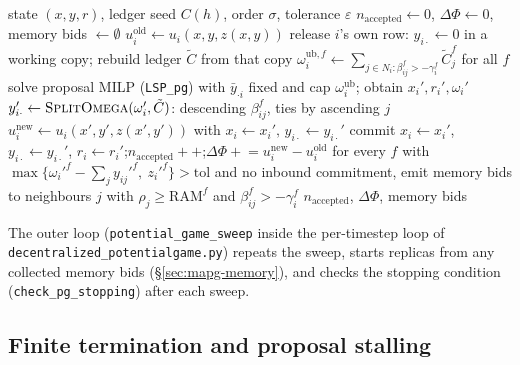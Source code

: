 \begin{algorithm}[H]
\caption{\textsc{FaaS-MAPG} --- one better-response sweep}
\label{alg:mapg-sweep}
\begin{algorithmic}[1]
\Require state $(x,y,r)$, ledger seed $C(h)$, order $\sigma$, tolerance $\varepsilon$
\State $n_{\mathrm{accepted}}\gets 0$, $\Delta\Phi\gets 0$, memory bids $\gets\emptyset$
  \State $u_i^{\mathrm{old}}\gets u_i(x,y,z(x,y))$
  \State release $i$'s own row: $y_{i\cdot}\gets0$ in a working copy; rebuild ledger $\tilde C$ from that copy
  \State $\omega_i^{\mathrm{ub},f}\gets\sum_{j\in N_i:\beta_{ij}^f>-\gamma_i^f}\tilde C_j^f$ for all $f$
  \State solve proposal MILP (\texttt{LSP\_pg}) with $\bar y_{\cdot i}$ fixed and cap $\omega_i^{\mathrm{ub}}$; obtain $x_i',r_i',\omega_i'$
  \State $y_{i\cdot}'\gets\textsc{SplitOmega}(\omega_i',\tilde C)$: descending $\beta_{ij}^f$, ties by ascending $j$
  \State $u_i^{\mathrm{new}}\gets u_i(x',y',z(x',y'))$ with $x_i\gets x_i',\,y_{i\cdot}\gets y_{i\cdot}'$
    \State commit $x_i\gets x_i'$, $y_{i\cdot}\gets y_{i\cdot}'$, $r_i\gets r_i'$;\quad $n_{\mathrm{accepted}}{+}{+}$;\quad $\Delta\Phi\mathrel{+}=u_i^{\mathrm{new}}-u_i^{\mathrm{old}}$
  \EndIf
  \State for every $f$ with $\max\{\omega_i'^f-\sum_j y_{ij}'^f,\ z_i'^f\}>\text{tol}$ and no inbound commitment, emit memory bids to neighbours $j$ with $\rho_j\ge\mathrm{RAM}^f$ and $\beta_{ij}^f>-\gamma_i^f$
\EndFor
\State \Return $n_{\mathrm{accepted}}$, $\Delta\Phi$, memory bids
\end{algorithmic}
\end{algorithm}

The outer loop (\texttt{potential\_game\_sweep} inside the per-timestep loop
of \texttt{decentralized\_potentialgame.py}) repeats the sweep, starts
replicas from any collected memory bids (\S\ref{sec:mapg-memory}), and checks
the stopping condition (\texttt{check\_pg\_stopping}) after each sweep.

\subsection{Finite termination and proposal stalling}
\label{sec:mapg-termination}

